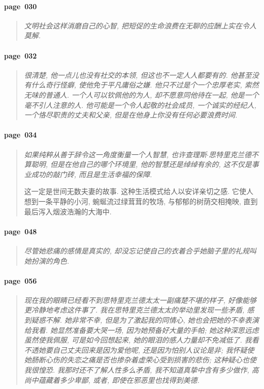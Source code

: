 \paragraph*{page~030}
\begin{quotation}
    \itshape
    文明社会这样消磨自己的心智, 把短促的生命浪费在无聊的应酬上实在令人莫解.
\end{quotation}

\paragraph*{page~032}
\begin{quotation}
    \itshape
    很清楚, 他一点儿也没有社交的本领, 但这也不一定人人都要有的. 他甚至没有什么奇行怪癖, 使他免于平凡庸俗之嫌. 他只不过是个一个忠厚老实, 索然无味的普通人. 一个人可以钦佩他的为人, 却不愿意同他待在一起, 他是一个毫不引人注意的人. 他可能是一个令人起敬的社会成员, 一个诚实的经纪人, 一个恪尽职责的丈夫和父亲, 但是在他身上你没有任何必要浪费时间.
\end{quotation}

\paragraph*{page~034}
\begin{quotation}
    \itshape
    如果纯粹从善于辞令这一角度衡量一个人智慧, 也许查理斯$\cdot$思特里克兰德不算聪明, 但是在他自己的哪个环境里, 他的智慧还是绰绰有余的, 这不仅是事业成功的敲门砖, 而且是生活幸福的保障.

    这一定是世间无数夫妻的故事. 这种生活模式给人以安详亲切之感. 它使人想到一条平静的小河, 蜿蜒流过绿茸茸的牧场, 与郁郁的树荫交相掩映, 直到最后泻入烟波浩瀚的大海中. 
\end{quotation}

\paragraph*{page~048}
\begin{quotation}
    \itshape
    尽管她悲痛的感情是真实的, 却没忘记使自己的衣着合乎她脑子里的礼规叫她扮演的角色. 
\end{quotation}

\paragraph*{page~056}
\begin{quotation}
    \itshape
    现在我的眼睛已经看不到思特里克兰德太太一副痛楚不堪的样子, 好像能够更冷静地考虑这件事了. 我在思特里克兰德太太的举动里发现一些矛盾, 感到疑惑不解. 她非常不幸, 但是为了激起我的同情心, 她也会把她的不幸表演给我看. 她显然准备要大哭一场, 因为她预备好大量的手帕; 她这种深思远虑虽然使我佩服, 可是如今回想起来, 她的眼泪的感人力量却不免减低了. 我看不透她要自己丈夫回来是因为爱他呢, 还是因为怕别人议论是非; 我怀疑使她肠断心伤的失恋之痛是否也掺杂着虚荣心受到损害的悲伤; 这种疑心也使我很惶恐. 我那时还不了解人性多么矛盾, 我不知道真挚中含有多少做作, 高尚中蕴藏着多少卑鄙, 或者, 即使在邪恶里也找得到美德. 
\end{quotation}

